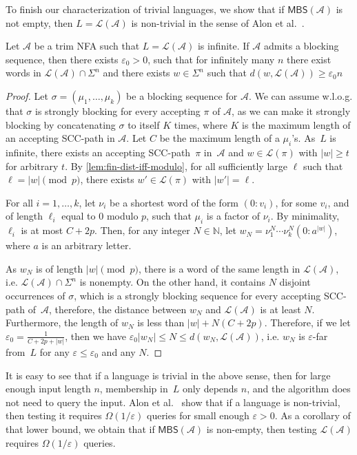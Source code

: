 \documentclass[letterpaper, USenglish, cleveref, autoref, thm-restate, numberwithinsect]{lipics-v2021}
\theoremstyle{theorem}
\theoremstyle{definition}
\newcommand{\Aa}{\mathcal{A}}
\newcommand{\eps}{\varepsilon}
\newcommand{\lang}[1]{\mathcal{L}(#1)}
\newcommand{\MBS}{\textsf{MBS}\xspace}
\newcommand{\NN}{\mathbb{N}}
\newcommand{\SCCpath}{\pi}
\newcommand{\timedword}[2]{(#1:#2)}
\begin{document}
To finish our characterization of trivial languages, we show that if $\MBS(\Aa)$ is not empty, then $L = \lang{\Aa}$ is non-trivial in the sense of Alon et al.~\cite{alon2001regular}.
\begin{lemma}
	\label{lem:charac-trivial}
	Let $\Aa$ be a trim NFA such that $L = \lang{\Aa}$ is infinite.
	If $\Aa$ admits a blocking sequence,
	then there exists $\eps_0 > 0$, such that for infinitely many $n$ there exist words in $\lang{\Aa} \cap \Sigma^n$ and there exists $w \in \Sigma^n$ such that $d(w,\lang{\Aa})\geq \eps_0 n$
\end{lemma}
\begin{proof} 
	Let $\sigma = (\mu_1, \ldots, \mu_k)$ be a blocking sequence for $\Aa$.
	We can assume w.l.o.g. that $\sigma$ is strongly blocking for every accepting $\SCCpath$ of $\Aa$, as we can make it strongly blocking by concatenating $\sigma$ to itself $K$ times, where $K$ is the maximum length of an accepting SCC-path in $\Aa$.
	Let $C$ be the maximum length of a $\mu_i$'s.
	As~$L$ is infinite, there exists an accepting SCC-path~$\SCCpath$ in~$\Aa$ and $w \in \lang{\SCCpath}$ with $|w| \geq t$ for arbitrary $t$.
	By \cref{lem:fin-dist-iff-modulo}, for all sufficiently large $\ell$ such that $\ell = |w| \pmod{p}$, there exists $w' \in \lang{\SCCpath}$ with $|w'| = \ell$.
	
	For all $i = 1,\ldots, k$, let $\nu_i$ be a shortest word of the form $\timedword{0}{v_i}$, for some $v_i$, and of length $\ell_i$ equal to $0$ modulo $p$, such that $\mu_i$ is a factor of $\nu_i$. By minimality, $\ell_i$ is at most $C+2p$.
	Then, for any integer $N \in \NN$, let $w_N = \nu_1^N \cdots \nu_k^N \timedword{0}{a^{|w|}}$, where $a$ is an arbitrary letter.
	
	As $w_N$ is of length $|w| \pmod{p}$, there is a word of the same length in $\lang{\Aa}$, i.e. $\lang{\Aa} \cap \Sigma^n$ is nonempty.
	On the other hand, it contains $N$ disjoint occurrences of $\sigma$, which is a strongly blocking sequence for every accepting SCC-path of~$\Aa$, therefore, the distance between $w_N$ and $\lang{\Aa}$ is at least $N$.
	Furthermore, the length of $w_N$ is less than $|w| + N(C+2p)$. 
	Therefore, if we let $\eps_0 = \frac{1}{C+2p+|w|}$, then we have $\eps_0 |w_N| \leq N \leq d(w_N, \lang{\Aa})$, i.e. $w_N$ is $\eps$-far from~$L$ for any $\eps \le \eps_0$ and any $N$.
\end{proof}

It is easy to see that if a language is trivial in the above sense, then for large enough input length $n$, membership in~$L$ only depends $n$, and the algorithm does not need to query the input.
Alon et al.~\cite{alon2001regular} show that if a language is non-trivial, then testing it requires $\Omega(1/\eps)$ queries for small enough $\eps > 0$.
As a corollary of that lower bound, we obtain that if $\MBS(\Aa)$ is non-empty, then testing $\lang{\Aa}$ requires $\Omega(1/\eps)$ queries.
 
\end{document}
